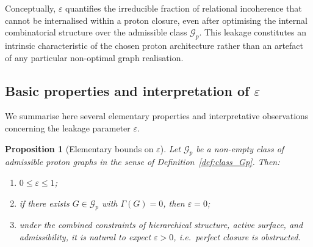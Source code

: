 \documentclass[11pt,a4paper]{article}
\newtheorem{proposition}[theorem]{Proposition}
\theoremstyle{definition}
\begin{document}
Conceptually, $\varepsilon$ quantifies the irreducible fraction of relational incoherence that cannot be internalised within a proton closure, even after optimising the internal combinatorial structure over the admissible class $\mathcal{G}_p$.\cite{Exponent_18_PDL_2026,Topological_Reformulation_PDL_2026} This leakage constitutes an intrinsic characteristic of the chosen proton architecture rather than an artefact of any particular non-optimal graph realisation.

\subsection{Basic properties and interpretation of \texorpdfstring{$\varepsilon$}{epsilon}}

We summarise here several elementary properties and interpretative observations concerning the leakage parameter $\varepsilon$.

\begin{proposition}[Elementary bounds on $\varepsilon$]
\label{prop:epsilon_bounds}
Let $\mathcal{G}_p$ be a non-empty class of admissible proton graphs in the sense of Definition~\ref{def:class_Gp}. Then:
\begin{enumerate}
  \item[(a)] $0 \leq \varepsilon \leq 1$;
  \item[(b)] if there exists $G\in\mathcal{G}_p$ with $\Gamma(G)=0$, then $\varepsilon=0$;
  \item[(c)] under the combined constraints of hierarchical structure, active surface, and admissibility, it is natural to expect $\varepsilon>0$, i.e.\ perfect closure is obstructed.
\end{enumerate}
\end{proposition}
\end{document}
